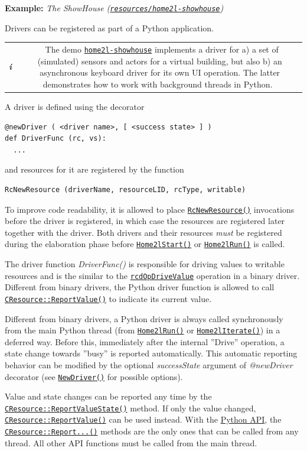\documentclass[12pt,english,parskip=half,headheight=19pt]{scrreprt}
\newcommand{\infobox}[1]{
  \par
  \medskip
  \hfill
  \setlength\arrayrulewidth{1pt}
  \begin{tabular}[t]{c|c|}
    \parbox{1.8em}{\hfill\textit{\Huge\textbf{i}\,}}
    &
    \,\parbox{0.89\linewidth}{\setlength{\parskip}{0.5em} \small #1}\,
  \end{tabular}
  \medskip
  \par
}
\newcommand{\idx}[1]{#1\index{#1}}
\newcommand{\reftool}[1]{\hyperref[tool:#1]{\texttt{\idx{#1}}}}
\newcommand{\refdoc}[2]{\href{#1}{#2}}              %
\newcommand{\refsrc}[1]{\href{#1}{\texttt{#1}}}     %
\newcommand{\refapic}[1]{\href{home2l-api_c/index.html}{\mbox{\texttt{#1}}}}            %
\newcommand{\refapipython}[1]{\href{home2l-api_python/index.html}{\mbox{\texttt{#1}}}}  %
\newcommand{\theapipython}{\refdoc{home2l-api_python/index.html}{Python API}}
\begin{document}
\textbf{Example:} \textit{The ShowHouse (\refsrc{resources/home2l-showhouse})}

Drivers can be registered as part of a Python application.

\infobox{
  The demo \reftool{home2l-showhouse} implements a driver for a) a set of (simulated)
  sensors and actors for a virtual building, but also
  b) an asynchronous keyboard driver for its own UI operation.
  The latter demonstrates how to work with background threads in Python.
}

A driver is defined using the decorator
\begin{lstlisting}
@newDriver ( <driver name>, [ <success state> ] )
def DriverFunc (rc, vs):
  ...
\end{lstlisting}

and resources for it are registered by the function
\begin{lstlisting}
RcNewResource (driverName, resourceLID, rcType, writable)
\end{lstlisting}

To improve code readability, it is allowed to place \refapipython{RcNewResource()} invocations before the driver is registered, in which case the resources are registered later together with the driver. Both drivers and their resources \textit{must} be registered during the elaboration phase before \refapipython{Home2lStart()} or \refapipython{Home2lRun()} is called.

The driver function \textit{DriverFunc()} is responsible for driving values to writable resources and is the similar to the
\refapic{rcdOpDriveValue} operation in a binary driver. Different from binary drivers, the Python driver function is allowed to call \refapic{CResource::ReportValue()} to indicate its current value.

Different from binary drivers, a Python driver is always called synchronously from the main Python thread (from \refapipython{Home2lRun()} or \refapipython{Home2lIterate()}) in a deferred way. Before this, immediately after the internal ''Drive'' operation, a state change towards ''busy'' is reported automatically. This automatic reporting behavior can be modified by the optional \textit{successState} argument of \textit{@newDriver} decorator (see \refapipython{NewDriver()} for possible options).

Value and state changes can be reported any time by the \refapic{CResource::ReportValueState()} method.
If only the value changed, \refapic{CResource::ReportValue()} can be used instead. With the \theapipython{}, the \refapic{CResource::Report...()} methods are the only ones that can be called from any thread. All other API functions must be called from the main thread.
\end{document}
